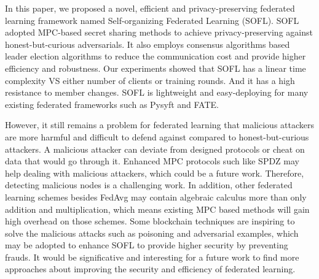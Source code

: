 In this paper, we proposed a novel, efficient and privacy-preserving federated learning framework named Self-organizing Federated Learning (SOFL). SOFL adopted MPC-based secret sharing methods to achieve privacy-preserving against honest-but-curious adversarials. It also employs consensus algorithms based leader election algorithms to reduce the communication cost and provide higher efficiency and robustness. Our experiments showed that SOFL has a linear time complexity VS either number of clients or training rounds. And it has a high resistance to member changes. SOFL is lightweight and easy-deploying for many existing federated frameworks such as Pysyft and FATE.

However, it still remains a problem for federated learning that malicious attackers are more harmful and difficult to defend against compared to honest-but-curious attackers. A malicious attacker can deviate from designed protocols or cheat on data that would go through it. Enhanced MPC protocols such like SPDZ\cite{SPDZ} may help dealing with malicious attackers, which could be a future work. Therefore, detecting malicious nodes is a challenging work. In addition, other federated learning schemes besides FedAvg may contain algebraic calculus more than only addition and multiplication, which means existing MPC based methods will gain high overhead on those schemes. Some blockchain techniques are inspiring to solve the malicious attacks such as poisoning and adversarial examples, which may be adopted to enhance SOFL to provide higher security by preventing frauds. It would be significative and interesting for a future work to find more approaches about improving the security and efficiency of federated learning.